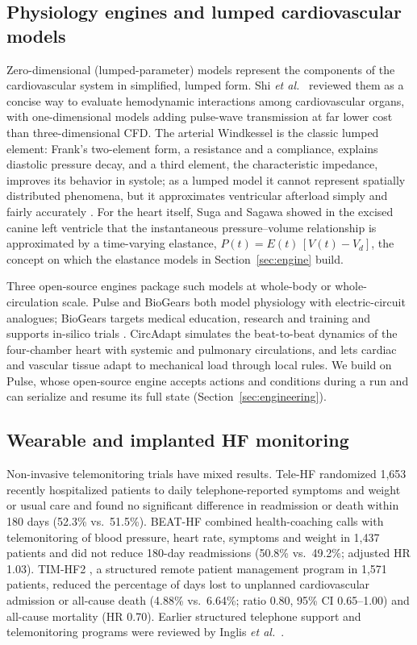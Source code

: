 \documentclass[conference]{IEEEtran}
\begin{document}
\subsection{Physiology engines and lumped cardiovascular models}\label{sec:rel-engines}
Zero-dimensional (lumped-parameter) models represent the components of the cardiovascular system in simplified, lumped form. Shi \textit{et al.}\ \cite{shi2011review} reviewed them as a concise way to evaluate hemodynamic interactions among cardiovascular organs, with one-dimensional models adding pulse-wave transmission at far lower cost than three-dimensional CFD. The arterial Windkessel is the classic lumped element: Frank's two-element form, a resistance and a compliance, explains diastolic pressure decay, and a third element, the characteristic impedance, improves its behavior in systole; as a lumped model it cannot represent spatially distributed phenomena, but it approximates ventricular afterload simply and fairly accurately \cite{westerhof2009windkessel}. For the heart itself, Suga and Sagawa \cite{suga1974elastance} showed in the excised canine left ventricle that the instantaneous pressure--volume relationship is approximated by a time-varying elastance, $P(t)=E(t)\,[V(t)-V_d]$, the concept on which the elastance models in Section~\ref{sec:engine} build.

Three open-source engines package such models at whole-body or whole-circulation scale. Pulse \cite{bray2019pulse,pulse_circuit_methodology} and BioGears \cite{baird2020biogears} both model physiology with electric-circuit analogues; BioGears targets medical education, research and training and supports in-silico trials \cite{baird2020biogears}. CircAdapt \cite{arts2005circadapt} simulates the beat-to-beat dynamics of the four-chamber heart with systemic and pulmonary circulations, and lets cardiac and vascular tissue adapt to mechanical load through local rules. We build on Pulse, whose open-source engine accepts actions and conditions during a run and can serialize and resume its full state (Section~\ref{sec:engineering}).

\subsection{Wearable and implanted HF monitoring}\label{sec:rel-monitoring}
Non-invasive telemonitoring trials have mixed results. Tele-HF \cite{chaudhry2010telehf} randomized 1,653 recently hospitalized patients to daily telephone-reported symptoms and weight or usual care and found no significant difference in readmission or death within 180 days (52.3\% vs.\ 51.5\%). BEAT-HF \cite{ong2016beathf} combined health-coaching calls with telemonitoring of blood pressure, heart rate, symptoms and weight in 1,437 patients and did not reduce 180-day readmissions (50.8\% vs.\ 49.2\%; adjusted HR 1.03). TIM-HF2 \cite{koehler2018timhf2}, a structured remote patient management program in 1,571 patients, reduced the percentage of days lost to unplanned cardiovascular admission or all-cause death (4.88\% vs.\ 6.64\%; ratio 0.80, 95\% CI 0.65--1.00) and all-cause mortality (HR 0.70). Earlier structured telephone support and telemonitoring programs were reviewed by Inglis \textit{et al.}\ \cite{inglis2008telemonitoring}.
\end{document}
